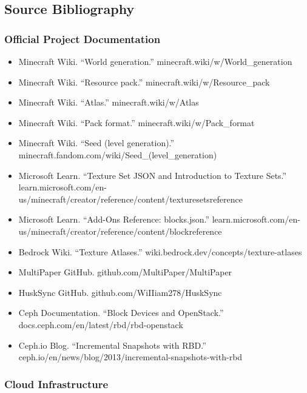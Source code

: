 \documentclass[11pt,letterpaper]{article}
\begin{document}
\subsection{Source Bibliography}

\subsubsection{Official Project Documentation}

\begin{itemize}[leftmargin=2em]
  \item Minecraft Wiki. ``World generation.'' minecraft.wiki/w/World\_generation
  \item Minecraft Wiki. ``Resource pack.'' minecraft.wiki/w/Resource\_pack
  \item Minecraft Wiki. ``Atlas.'' minecraft.wiki/w/Atlas
  \item Minecraft Wiki. ``Pack format.'' minecraft.wiki/w/Pack\_format
  \item Minecraft Wiki. ``Seed (level generation).'' minecraft.fandom.com/wiki/Seed\_(level\_generation)
  \item Microsoft Learn. ``Texture Set JSON and Introduction to Texture Sets.'' learn.microsoft.com/en-us/minecraft/creator/reference/content/texturesetsreference
  \item Microsoft Learn. ``Add-Ons Reference: blocks.json.'' learn.microsoft.com/en-us/minecraft/creator/reference/content/blockreference
  \item Bedrock Wiki. ``Texture Atlases.'' wiki.bedrock.dev/concepts/texture-atlases
  \item MultiPaper GitHub. github.com/MultiPaper/MultiPaper
  \item HuskSync GitHub. github.com/WiIIiam278/HuskSync
  \item Ceph Documentation. ``Block Devices and OpenStack.'' docs.ceph.com/en/latest/rbd/rbd-openstack
  \item Ceph.io Blog. ``Incremental Snapshots with RBD.'' ceph.io/en/news/blog/2013/incremental-snapshots-with-rbd
\end{itemize}

\subsubsection{Cloud Infrastructure}
\end{document}
